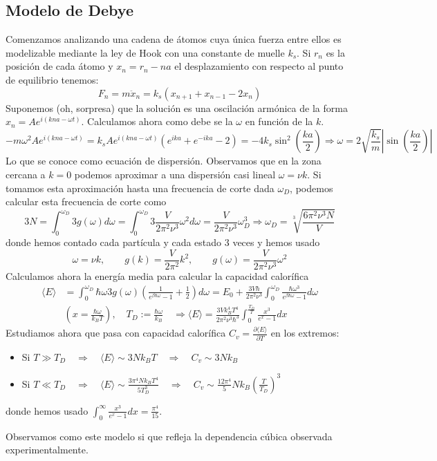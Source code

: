 \documentclass[leqno]{article}
\begin{document}
\subsection{Modelo de Debye}
Comenzamos analizando una cadena de átomos cuya única fuerza entre ellos es modelizable mediante la ley de Hook con una constante de muelle $k_s$. Si  $r_n$ es la posición de cada átomo y $x_n = r_n-na$ el desplazamiento con respecto al punto de equilibrio tenemos:
 \[
F_n =m\ddot{x}_n = k_s(x_{n+1}+x_{n-1}-2x_n)
\] 
Suponemos (oh, sorpresa) que la solución es una oscilación armónica de la forma $x_n = A e^{i(kna-\omega t)}$. Calculamos ahora como debe se la $\omega $ en función de la $k$.
 \[
   -m\omega ^2 Ae^{i(kna-\omega t)} = k_sAe^{i(kna-\omega t)}(e^{ika}+e^{-ika}-2) = -4k_s \sin^2\left( \frac{ka}{2} \right)  \Rightarrow \boxed{\omega = 2 \sqrt{\frac{k_s}{m}}\left|\sin \left( \frac{ka}{2} \right) \right| }
\] 
Lo que se conoce como ecuación de dispersión. Observamos que en la zona cercana a $k=0$ podemos aproximar a una dispersión casi lineal  $\omega =\nu k$. Si tomamos esta aproximación hasta una frecuencia de corte dada $\omega _D$, podemos calcular esta frecuencia de corte como
\[
  3N = \int_0^{\omega _D} 3g(\omega )d\omega =\int_0^{\omega _D}3 \frac{V}{2\pi^2\nu^3}\omega ^2 d\omega = \frac{V}{2\pi^2 \nu^3}\omega _D^3 \Rightarrow \boxed{\omega _D = \sqrt[3]{\frac{6\pi^2\nu^3N}{V}} }
\] 
donde hemos contado cada partícula y cada estado 3 veces y hemos usado
\[
\omega = \nu k, \qquad g(k)=\frac{V}{2\pi^2}k^2, \qquad g(\omega )= \frac{V}{2\pi^2 \nu^3}\omega ^2
\]
Calculamos ahora la energía media para calcular la capacidad calorífica
\begin{align*}
  \langle E \rangle &= \int_0^{\omega _D}\hbar \omega 3g(\omega )\left( \frac{1}{e^{\beta \hbar \omega }-1} +\frac{1}{2} \right) d\omega  = E_0 + \frac{3V\hbar }{2\pi^2\nu^3} \int_0^{\omega _D}\frac{\hbar \omega ^3}{e^{\beta \hbar \omega }-1} d\omega \\
	   & (x=\frac{\hbar \omega }{k_B T}), \quad T_D := \frac{\hbar \omega }{k_B} \quad   \Rightarrow  \boxed{\langle E \rangle = \frac{3Vk_B^4T^4}{2\pi^2\nu^3\hbar ^3}\int_0^{\frac{T_D}{T}}\frac{x^3}{e^x-1}dx }
\end{align*}
Estudiamos ahora que pasa con capacidad calorífica $C_v = \frac{\partial \langle E \rangle }{\partial T}$ en los extremos:
\begin{itemize}[topsep=-6pt, itemsep=0pt]
  \item Si $T\gg T_D \quad \Rightarrow \quad \langle E \rangle \sim 3Nk_BT \quad \Rightarrow \quad C_v \sim  3Nk_B $
  \item Si $T\ll T_D \quad \Rightarrow \quad \langle E \rangle \sim  \frac{3\pi^4Nk_BT^4}{5T_D^3}\quad\Rightarrow \quad C_v \sim  \frac{12\pi^4}{5}Nk_B \left( \frac{T}{T_D} \right)^3 $
\end{itemize}
donde hemos usado $\int_0^\infty \frac{x^3}{e^x-1}dx=\frac{\pi^4}{15}$.

Observamos como este modelo si que refleja la dependencia cúbica observada experimentalmente.
\end{document}
